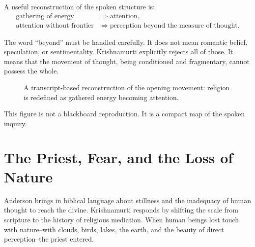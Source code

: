 A useful reconstruction of the spoken structure is:
\begin{align}
\text{gathering of energy}
&\Rightarrow \text{attention},\\
\text{attention without frontier}
&\Rightarrow \text{perception beyond the measure of thought}.
\end{align}

The word ``beyond'' must be handled carefully. It does not mean romantic belief, speculation, or sentimentality. Krishnamurti explicitly rejects all of those. It means that the movement of thought, being conditioned and fragmentary, cannot possess the whole.

\begin{figure}
\centering
{}
\caption{A transcript-based reconstruction of the opening movement: religion is redefined as gathered energy becoming attention.}
\end{figure}

This figure is not a blackboard reproduction. It is a compact map of the spoken inquiry.

\section{The Priest, Fear, and the Loss of Nature}

Anderson brings in biblical language about stillness and the inadequacy of human thought to reach the divine. Krishnamurti responds by shifting the scale from scripture to the history of religious mediation. When human beings lost touch with nature--with clouds, birds, lakes, the earth, and the beauty of direct perception--the priest entered.

